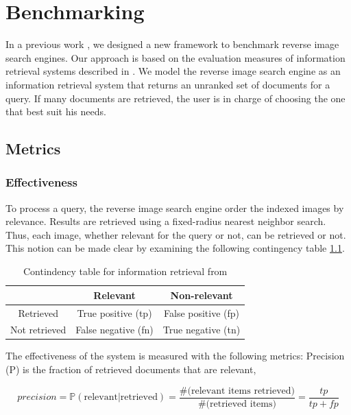 \chapter{Benchmarking}

\label{chapter:Benchmarking}


In a previous work \cite{gaillardlarge}, we designed a new framework to benchmark reverse image search engines. Our approach is based on the evaluation measures of information retrieval systems described in \cite{manning2008introduction}. We model the reverse image search engine as an information retrieval system that returns an unranked set of documents for a query. If many documents are retrieved, the user is in charge of choosing the one that best suit his needs.

\section{Metrics}

\subsection{Effectiveness}
To process a query, the reverse image search engine order the indexed images by relevance. Results are retrieved using a fixed-radius nearest neighbor search. Thus, each image, whether relevant for the query or not, can be retrieved or not. This notion can be made clear by examining the following contingency table \ref{table:contingency_table}.

\begin{table}[h]
\centering
\caption{Contindency table for information retrieval from \cite{manning2008introduction}}
\label{table:contingency_table}
\begin{tabular}{|c|c|c|}
\hline
              & Relevant            & Non-relevant        \\
\hline
Retrieved     & True positive (tp)  & False positive (fp) \\
\hline
Not retrieved & False negative (fn) & True negative (tn)  \\
\hline
\end{tabular}
\end{table}

The effectiveness of the system is measured with the following metrics: Precision (P) is the fraction of retrieved documents that are relevant,

\[precision=\mathbb{P}(\text{relevant}|\text{retrieved})=\frac{\text{\#(relevant items retrieved)}}{\text{\#(retrieved items)}}=\frac{tp}{tp+fp}\]

